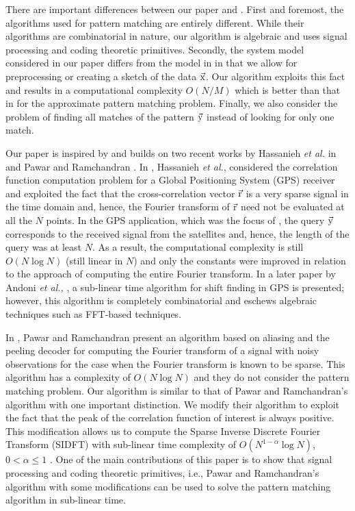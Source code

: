 There are important differences between our paper and \cite{hassanieh2012faster,andoni2013shift,boyer1977fast,amir2004faster}. First and foremost, the algorithms used for pattern matching are entirely different. While their algorithms are combinatorial in nature, our algorithm is algebraic and uses signal processing and coding theoretic primitives. Secondly, the system model considered in our paper differs from the model in \cite{hassanieh2012faster,andoni2013shift,boyer1977fast,amir2004faster} in that we allow for preprocessing or creating a sketch of the data $\vec{\mathrm{x}}$. Our algorithm exploits this fact and results in a computational complexity $O(N/M)$ which is better than that in \cite{andoni2013shift} for the approximate pattern matching problem.  Finally, we also consider the problem of finding all matches of the pattern $\vec{\mathrm{y}}$ instead of looking for only one match.

Our paper is inspired by and builds on two recent works by Hassanieh {\em {et al.}} in \cite{hassanieh2012faster} and Pawar and Ramchandran \cite{pawar2014robust}. In \cite{hassanieh2012faster}, Hassanieh \emph{et al.}, considered the correlation function computation problem for a Global Positioning System (GPS) receiver and exploited the fact that the cross-correlation vector $\vec{\mathrm{r}}$ is a very sparse signal in the time domain and, hence, the Fourier transform of $\vec{\mathrm{r}}$ need not be evaluated at all the $N$ points. In the GPS application, which was the focus of \cite{hassanieh2012faster}, the query $\vec{\mathrm{y}}$ corresponds to the received signal from the satellites and, hence, the length of the query was at least $N$. As a result, the computational complexity is still $O(N \log N)$ (still linear in $N$) and only the constants were improved in relation to the approach of computing the entire Fourier transform. In a later paper by Andoni {\em et al.,} \cite{andoni2013shift}, a sub-linear time algorithm for shift finding in GPS is presented; however, this algorithm is completely combinatorial and eschews algebraic techniques such as FFT-based techniques.

In \cite{pawar2014robust}, Pawar and Ramchandran present an algorithm based on aliasing and the peeling decoder for computing the Fourier transform of a signal with noisy observations for the case when the Fourier transform is known to be sparse. This algorithm has a complexity of $O(N \log N)$ and they do not consider the pattern matching problem. Our algorithm is similar to that of Pawar and Ramchandran's algorithm with one important distinction. We modify their algorithm to exploit the fact that the peak of the correlation function of interest is always positive. This modification allows us to compute the Sparse Inverse Discrete Fourier Transform (SIDFT) with sub-linear time complexity of $O(N^{1-\alpha} \log N)$, $0 < \alpha \leq 1$ . One of the main contributions of this paper is to show that signal processing and coding theoretic primitives, i.e., Pawar and Ramchandran's algorithm with some modifications can be used to solve the pattern matching algorithm in sub-linear time.
